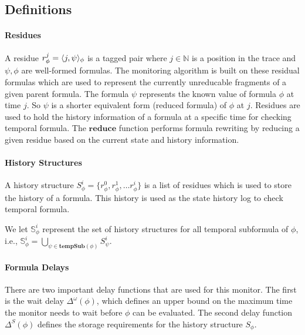 \subsection{Definitions}
\paragraph{Residues}
A residue $r^j_{\phi} = \langle j, \psi \rangle_{\phi}$ is a tagged pair where $j \in \mathbb{N}$ is a position in the trace and $\psi, \phi$ are well-formed formulas. The monitoring algorithm is built on these residual formulas which are used to represent the currently unreducable fragments of a given parent formula. 
The formula $\psi$ represents the known value of formula $\phi$ at time $j$. So $\psi$ is a shorter equivalent form (reduced formula) of $\phi$ at $j$. 
Residues are used to hold the history information of a formula at a specific time for checking temporal formula.
The $\mathbf{reduce}$ function performs formula rewriting by reducing a given residue based on the current state and history information. 


\paragraph{History Structures}
A history structure $S_{\phi}^i = \{ r_{\phi}^0, r_{\phi}^1, \ldots r_{\phi}^i \}$ is a list of residues which is used to store the history of a formula. This history is used as the state history log to check temporal formula. 

We let $\mathbb{S}^i_{\phi}$ represent the set of history structures for all temporal subformula of $\phi$, i.e., $\mathbb{S}^i_{\phi} = \bigcup_{\psi \in \mathbf{tempSub}(\phi)} S^i_{\psi}$.

\paragraph{Formula Delays}
There are two important delay functions that are used for this monitor. The first is the wait delay $\Delta^{\omega}(\phi)$, which defines an upper bound on the maximum time the monitor needs to wait before $\phi$ can be evaluated.
%
The second delay function $\Delta^{S}(\phi)$ defines the storage requirements for the history structure $S_\phi$.


